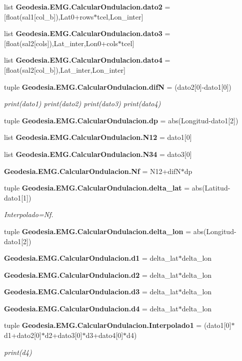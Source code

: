 \begin{DoxyCompactItemize}
list {\bf Geodesia.\-E\-M\-G.\-Calcular\-Ondulacion.\-dato2} = [float(sal1[col\-\_\-b]),Lat0+rows$\ast$tcel,Lon\-\_\-inter]
\item 
list {\bf Geodesia.\-E\-M\-G.\-Calcular\-Ondulacion.\-dato3} = [float(sal2[cols]),Lat\-\_\-inter,Lon0+cols$\ast$tcel]
\item 
list {\bf Geodesia.\-E\-M\-G.\-Calcular\-Ondulacion.\-dato4} = [float(sal2[col\-\_\-b]),Lat\-\_\-inter,Lon\-\_\-inter]
\item 
tuple {\bf Geodesia.\-E\-M\-G.\-Calcular\-Ondulacion.\-dif\-N} = (dato2[0]-\/dato1[0])
\begin{DoxyCompactList}\small\item\em print(dato1) print(dato2) print(dato3) print(dato4) \end{DoxyCompactList}\item 
tuple {\bf Geodesia.\-E\-M\-G.\-Calcular\-Ondulacion.\-dp} = abs(Longitud-\/dato1[2])
\item 
list {\bf Geodesia.\-E\-M\-G.\-Calcular\-Ondulacion.\-N12} = dato1[0]
\item 
list {\bf Geodesia.\-E\-M\-G.\-Calcular\-Ondulacion.\-N34} = dato3[0]
\item 
{\bf Geodesia.\-E\-M\-G.\-Calcular\-Ondulacion.\-Nf} = N12+dif\-N$\ast$dp
\item 
tuple {\bf Geodesia.\-E\-M\-G.\-Calcular\-Ondulacion.\-delta\-\_\-lat} = abs(Latitud-\/dato1[1])
\begin{DoxyCompactList}\small\item\em Interpolado=Nf. \end{DoxyCompactList}\item 
tuple {\bf Geodesia.\-E\-M\-G.\-Calcular\-Ondulacion.\-delta\-\_\-lon} = abs(Longitud-\/dato1[2])
\item 
{\bf Geodesia.\-E\-M\-G.\-Calcular\-Ondulacion.\-d1} = delta\-\_\-lat$\ast$delta\-\_\-lon
\item 
{\bf Geodesia.\-E\-M\-G.\-Calcular\-Ondulacion.\-d2} = delta\-\_\-lat$\ast$delta\-\_\-lon
\item 
{\bf Geodesia.\-E\-M\-G.\-Calcular\-Ondulacion.\-d3} = delta\-\_\-lat$\ast$delta\-\_\-lon
\item 
{\bf Geodesia.\-E\-M\-G.\-Calcular\-Ondulacion.\-d4} = delta\-\_\-lat$\ast$delta\-\_\-lon
\item 
tuple {\bf Geodesia.\-E\-M\-G.\-Calcular\-Ondulacion.\-Interpolado1} = (dato1[0]$\ast$d1+dato2[0]$\ast$d2+dato3[0]$\ast$d3+dato4[0]$\ast$d4)
\begin{DoxyCompactList}\small\item\em print(d4) \end{DoxyCompactList}\item 

\end{DoxyCompactItemize}
